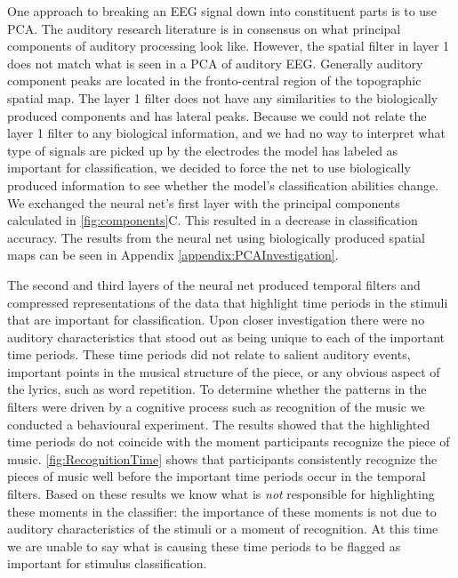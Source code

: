 One approach to breaking an EEG signal down into constituent parts is to use \ac{PCA}.
The auditory research literature is in consensus on what principal components of auditory processing look like.
However, the spatial filter in layer 1 does not match what is seen in a \ac{PCA} of auditory \ac{EEG}.
Generally auditory component peaks are located in the fronto-central region of the topographic spatial map. 
The layer 1 filter does not have any similarities to the biologically produced components and has lateral peaks. 
Because we could not relate the layer 1 filter to any biological information, and we had no way to interpret what type of signals are picked up by the electrodes the model has labeled as important for classification, we decided to force the net to use biologically produced information to see whether the model's classification abilities change. 
We exchanged the neural net's first layer with the principal components calculated in \autoref{fig:components}C. 
This resulted in a decrease in classification accuracy. The results from the neural net using biologically produced spatial maps can be seen in Appendix \ref{appendix:PCAInvestigation}.

The second and third layers of the neural net produced temporal filters and compressed representations of the data that highlight time periods in the stimuli that are important for classification. 
Upon closer investigation there were no auditory characteristics that stood out as being unique to each of the important time periods.
These time periods did not relate to salient auditory events, important points in the musical structure of the piece, or any obvious aspect of the lyrics, such as word repetition. 
To determine whether the patterns in the filters were driven by a cognitive process such as recognition of the music we conducted a behavioural experiment.
The results showed that the highlighted time periods do not coincide with the moment participants recognize the piece of music. 
\autoref{fig:RecognitionTime} shows that participants consistently recognize the pieces of music well before the important time periods occur in the temporal filters. 
Based on these results we know what is \emph{not} responsible for highlighting these moments in the classifier: the importance of these moments is not due to auditory characteristics of the stimuli or a moment of recognition.
At this time we are unable to say what is causing these time periods to be flagged as important for stimulus classification. 

